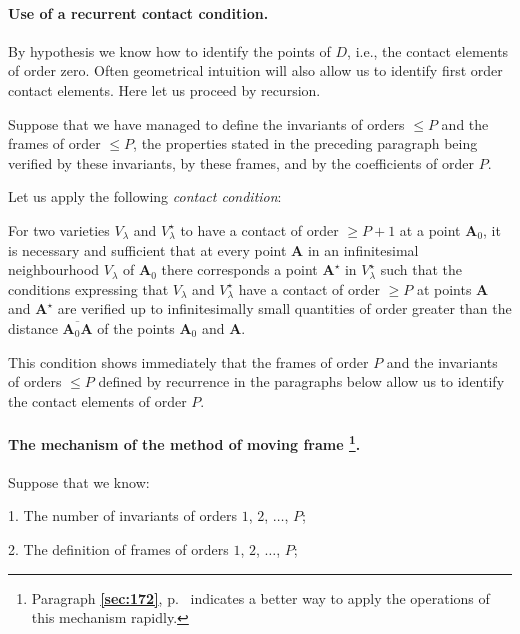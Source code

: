 \documentclass[leqno,11pt]{book}
\numberwithin{equation}{chapter}
\theoremstyle{shape1}
\theoremstyle{shapesmall}
\newcommand{\fsref}[1]{{\rm\textsection\textbf{\ref{sec:#1}}}}
\newcommand{\str}{^{\star}}
\newcommand{\somespace}{\vspace{9pt}}
\begin{document}
\paragraph{Use of a recurrent contact condition.}
\label{sec:128}
By hypothesis we know how to identify the points of $D$, i.e., the contact elements of order zero. Often geometrical intuition will also allow us to identify first order contact elements. Here let us proceed by recursion.

Suppose that we have managed to define the invariants of orders $\le P$ and the frames of order $\le P$, the properties stated in the preceding paragraph being verified by these invariants, by these frames, and by the coefficients of order $P$.

Let us apply the following \emph{contact condition}:

\somespace

For two varieties $V_{\lambda}$ and $V_{\lambda}\str$ to have a contact of order $\ge P+1$ at a point $\mathbf{A}_{0}$, it is necessary and sufficient that at every point $\mathbf{A}$ in an infinitesimal neighbourhood $V_{\lambda}$ of $\mathbf{A}_{0}$ there corresponds a point $\mathbf{A}\str$ in $V_{\lambda}\str$ such that the conditions expressing that $V_{\lambda}$ and $V_{\lambda}\str$ have a contact of order $\ge P$ at points $\mathbf{A}$ and $\mathbf{A}\str$ are verified up to infinitesimally small quantities of order greater than the distance $\overline{\mathbf{A}_{0}\mathbf{A}}$ of the points $\mathbf{A}_{0}$ and $\mathbf{A}$.

This condition shows immediately that the frames of order $P$ and the invariants of orders $\le P$ defined by recurrence in the paragraphs below allow us to identify the contact elements of order $P$.


\paragraph[The mechanism of the method of moving frame.]{The mechanism of the method of moving frame \footnote{Paragraph \fsref{172}, p.~\pageref{sec:172} indicates a better way to apply the operations of this mechanism rapidly.}.}
\label{sec:129}
Suppose that we know:

\somespace

1. The number of invariants of orders $1$, $2$, $\dots$, $P$;

2. The definition of frames of orders $1$, $2$, $\dots$, $P$;
\end{document}

